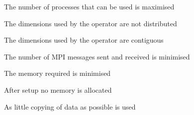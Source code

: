 \vspace*{\fill}
  \begin{minipage}{\mysidebarwidth}
   \begin{todolist}
    \ifUsedMaxNProc
     \item[\done]
    \else
     \item
    \fi The number of processes that can be used is maximised
    \ifUsedDimsNotDistrib
     \item[\done]
    \else
     \item
    \fi  The dimensions used by the operator are not distributed
    \ifUsedDimsContig
     \item[\done]
    \else
     \item
    \fi  The dimensions used by the operator are contiguous
    \ifUsedMinMPI
     \item[\done]
    \else
     \item
    \fi  The number of MPI messages sent and received is minimised
    \ifUsedMinMemory
     \item[\done]
    \else
     \item
    \fi  The memory required is minimised
    \ifUsedNoMemAlloc
     \item[\done]
    \else
     \item
    \fi  After setup no memory is allocated
    \ifUsedMinCopy
     \item[\done]
    \else
     \item
    \fi  As little copying of data as possible is used
   \end{todolist}
  \end{minipage}\par
  \vfill
  \parbox{\mywd}{\centering\textcolor{white}{\insertauthor}}
  \vspace*{0.6cm}